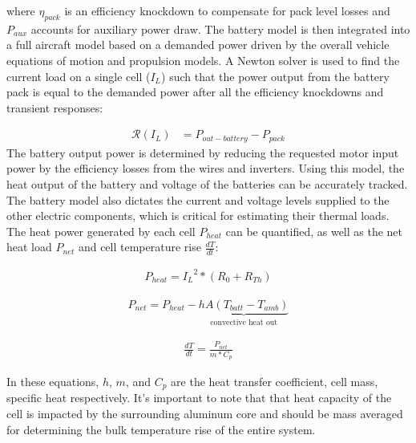 \documentclass[]{aiaa-tc}%
\begin{document}
where $\eta_{pack}$ is an efficiency knockdown to compensate for pack level losses and $P_{aux}$ accounts for auxiliary power draw.
%
The battery model is then integrated into a full aircraft model based on a demanded power driven by the overall vehicle equations of motion and propulsion models. 
A Newton solver is used to find the current load on a single cell ($I_L$) such that the power output from the battery pack is equal to the demanded power after all the efficiency knockdowns and transient responses:

\begin{align}
\mathcal{R}(I_L) &= P_{out-battery} - P_{pack} \label{eq:resid_I_L}
\end{align}
%
The battery output power is determined by reducing the requested motor input power by the efficiency losses from the wires and inverters.  Using this model, the heat output of the battery and voltage of the batteries can be accurately tracked. The battery model also dictates the current and voltage levels supplied to the other electric components, which is critical for estimating their thermal loads. The heat power generated by each cell $P_{heat}$ can be quantified, as well as the net heat load $P_{net}$ and cell temperature rise $\frac{dT}{dt}$:

\begin{align}
P_{heat} = {I_L}^2 * (R_0 + R_{Th})
\label{eq:heat}
\end{align}

\begin{align}
P_{net} = P_{heat} - \underbrace{hA(T_{batt}-T_{amb})}_{\text{convective heat out}}
\label{eq:heatBalance}
\end{align}

\begin{align}
\frac{dT}{dt} = \frac{P_{net}}{m*C_p}
\label{eq:heatRise}
\end{align}

In these equations, $h$, $m$, and $C_p$ are the heat transfer coefficient, cell mass, specific heat respectively. It's important to note that that heat capacity of the cell is impacted by the surrounding aluminum core and should be mass averaged for determining the bulk temperature rise of the entire system.


\end{document}
